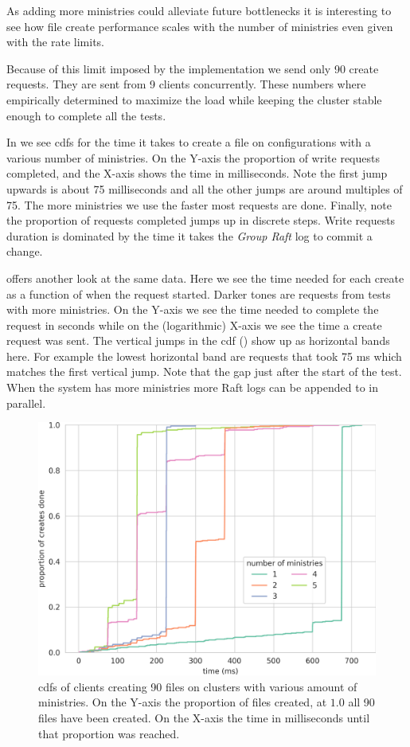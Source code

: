 As adding more ministries could alleviate future bottlenecks it is interesting to see how file create performance scales with the number of ministries even given with the rate limits.

Because of this limit imposed by the implementation we send only 90 create requests. They are sent from 9 clients concurrently. These numbers where empirically determined to maximize the load while keeping the cluster stable enough to complete all the tests.

In  we see \acp{cdf} for the time it takes to create a file on configurations with a various number of ministries. On the Y-axis the proportion of write requests completed, and the X-axis shows the time in milliseconds. Note the first jump upwards is about 75 milliseconds and all the other jumps are around multiples of 75. The more ministries we use the faster most requests are done. Finally, note the proportion of requests completed jumps up in discrete steps. Write requests duration is dominated by the time it takes the \textit{Group Raft} log to commit a change.

 offers another look at the same data. Here we see the time needed for each create as a function of when the request started. Darker tones are requests from tests with more ministries. On the Y-axis we see the time needed to complete the request in seconds while on the (logarithmic) X-axis we see the time a create request was sent. The vertical jumps in the \ac{cdf} () show up as horizontal bands here. For example the lowest horizontal band are requests that took 75 ms which matches the first vertical jump. Note that the gap just after the start of the test. When the system has more ministries more Raft logs can be appended to in parallel.

\begin{figure}[htb]
	\centering
	\includegraphics[height=\textheight]{../results/plots/touch.png}
	\caption{\acp{cdf} of clients creating 90 files on clusters with various amount of ministries. On the Y-axis the proportion of files created, at $1.0$ all 90 files have been created. On the X-axis the time in milliseconds until that proportion was reached.}
	\label{fig:touch}
\end{figure}

